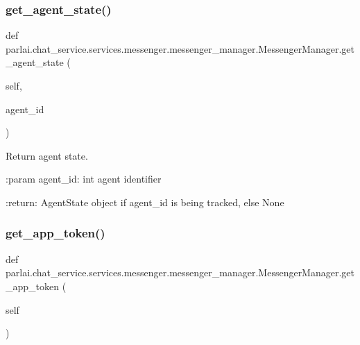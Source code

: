 \subsubsection{\texorpdfstring{get\+\_\+agent\+\_\+state()}{get\_agent\_state()}}
{\footnotesize\ttfamily def parlai.\+chat\+\_\+service.\+services.\+messenger.\+messenger\+\_\+manager.\+Messenger\+Manager.\+get\+\_\+agent\+\_\+state (\begin{DoxyParamCaption}\item[{}]{self,  }\item[{}]{agent\+\_\+id }\end{DoxyParamCaption})}

\begin{DoxyVerb}Return agent state.

:param agent_id:
    int agent identifier

:return:
    AgentState object if agent_id is being tracked, else None
\end{DoxyVerb}
 \mbox{\label{classparlai_1_1chat__service_1_1services_1_1messenger_1_1messenger__manager_1_1MessengerManager_a0fa4fe590efa528624a0965dbb995683}} 
\subsubsection{\texorpdfstring{get\+\_\+app\+\_\+token()}{get\_app\_token()}}
{\footnotesize\ttfamily def parlai.\+chat\+\_\+service.\+services.\+messenger.\+messenger\+\_\+manager.\+Messenger\+Manager.\+get\+\_\+app\+\_\+token (\begin{DoxyParamCaption}\item[{}]{self }\end{DoxyParamCaption})}

